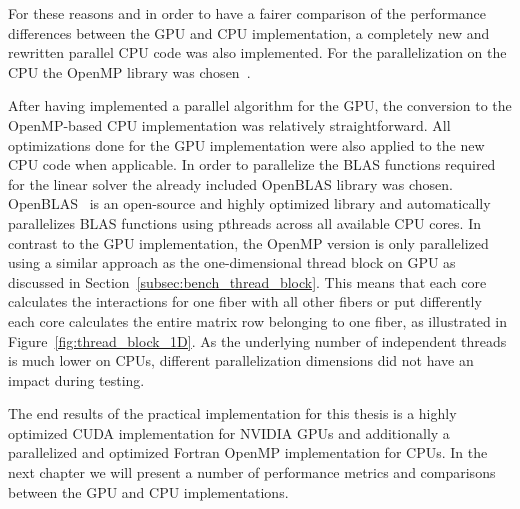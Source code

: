For these reasons and in order to have a fairer comparison of the performance differences between the GPU and CPU implementation, a completely new and rewritten parallel CPU code was also implemented. For the parallelization on the CPU the OpenMP library was chosen~\cite{OpenMP}.

After having implemented a parallel algorithm for the GPU, the conversion to the OpenMP-based CPU implementation was relatively straightforward. All optimizations done for the GPU implementation were also applied to the new CPU code when applicable. In order to parallelize the BLAS functions required for the linear solver the already included OpenBLAS library was chosen. OpenBLAS~\cite{OpenBLAS} is an open-source and highly optimized library and automatically parallelizes BLAS functions using pthreads across all available CPU cores. In contrast to the GPU implementation, the OpenMP version is only parallelized using a similar approach as the one-dimensional thread block on GPU as discussed in Section~\ref{subsec:bench_thread_block}. This means that each core calculates the interactions for one fiber with all other fibers or put differently each core calculates the entire matrix row belonging to one fiber, as illustrated in Figure~\ref{fig:thread_block_1D}. As the underlying number of independent threads is much lower on CPUs, different parallelization dimensions did not have an impact during testing.

The end results of the practical implementation for this thesis is a highly optimized CUDA implementation for NVIDIA GPUs and additionally a parallelized and optimized Fortran OpenMP implementation for CPUs. In the next chapter we will present a number of performance metrics and comparisons between the GPU and CPU implementations.
